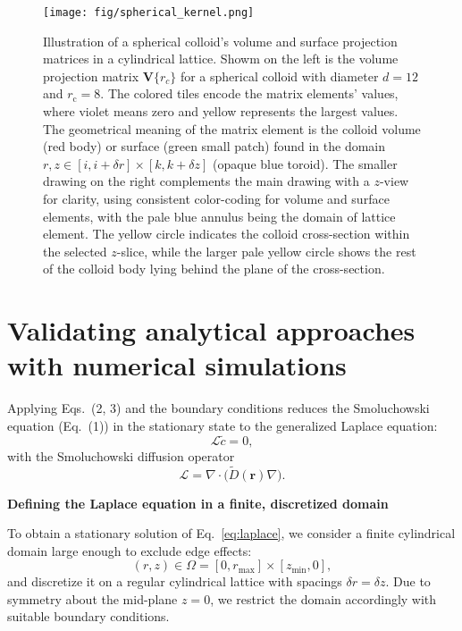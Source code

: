 \documentclass[10pt, a4paper, twocolumn]{article}
\begin{document}
\begin{figure}[H]
    \centering
    \texttt{[image: fig/spherical\_kernel.png]}
    \caption{
        Illustration of a spherical colloid's volume and surface projection matrices in a cylindrical lattice.
        Showm on the left is the volume projection matrix $\bm{V}\{r_c\}$ for a spherical colloid with diameter $d = 12$ and $r_{\text{c}}= 8$.
        The colored tiles encode the matrix elements' values, where violet means zero and yellow represents the largest values.
        The geometrical meaning of the matrix element is the colloid volume (red body) or surface (green small patch) found in the domain $r,z \in [i, i + \delta r] \times [k, k + \delta z]$ (opaque blue toroid).
        The smaller drawing on the right complements the main drawing with a $z$-view for clarity, using consistent color-coding for volume and surface elements, with the pale blue annulus being the domain of lattice element.
        The yellow circle indicates the colloid cross-section within the selected $z$-slice, while the larger pale yellow circle shows the rest of the colloid body lying behind the plane of the cross-section.
    }
    \label{fig:spherical_kernel}
\end{figure}


\pagebreak
\section{Validating analytical approaches with numerical simulations}

Applying Eqs.~(2, 3) and the boundary conditions reduces the Smoluchowski equation (Eq.~(1)) in the stationary state to the generalized Laplace equation:
\begin{equation}
  \mathcal L\tilde c=0,
  \label{eq:laplace}
\end{equation}
with the Smoluchowski diffusion operator
\begin{equation*}
  \mathcal L=\nabla\!\cdot\!\bigl(\tilde D(\bm r)\nabla\bigr).
\end{equation*}

\bigskip
\textbf{Defining the Laplace equation in a finite, discretized domain}

To obtain a stationary solution of Eq.~\eqref{eq:laplace}, we consider a finite cylindrical domain large enough to exclude edge effects:
\begin{equation*}
  (r,z) \in \Omega = [0,r_{\max}]\times[z_{\min},0],
\end{equation*}
and discretize it on a regular cylindrical lattice with spacings $\delta r=\delta z$. 
Due to symmetry about the mid-plane $z = 0$, we restrict the domain accordingly with suitable boundary conditions.
\end{document}
